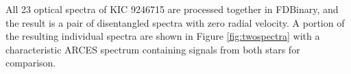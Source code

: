 All 23 optical spectra of KIC 9246715 are processed together in FDBinary, and the result is a pair of disentangled spectra with zero radial velocity. A portion of the resulting individual spectra are shown in Figure \ref{fig:twospectra} with a characteristic ARCES spectrum containing signals from both stars for comparison.

  